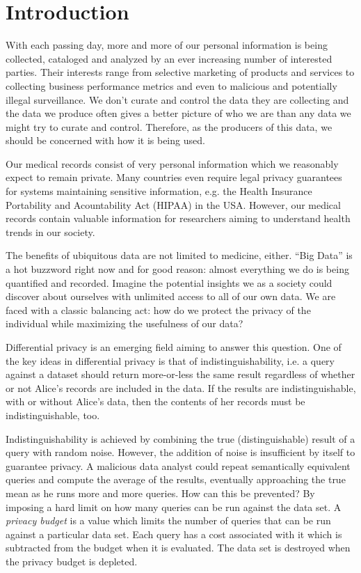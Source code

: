 \documentclass[12pt]{report}
\begin{document}
\clearpage
\tableofcontents
\clearpage
\listoffigures
\clearpage

\chapter{Introduction}\label{sec:introduction}

With each passing day, more and more of our personal information is being collected, cataloged and analyzed by an ever increasing number of interested parties.
Their interests range from selective marketing of products and services to collecting business performance metrics and even to malicious and potentially illegal surveillance.
We don't curate and control the data they are collecting and the data we produce often gives a better picture of who we are than any data we might try to curate and control.
Therefore, as the producers of this data, we should be concerned with how it is being used.

Our medical records consist of very personal information which we reasonably expect to remain private.
Many countries even require legal privacy guarantees for systems maintaining sensitive information, e.g. the Health Insurance Portability and Acountability Act (HIPAA) in the USA.
However, our medical records contain valuable information for researchers aiming to understand health trends in our society.

The benefits of ubiquitous data are not limited to medicine, either.
``Big Data'' is a hot buzzword right now and for good reason: almost everything we do is being quantified and recorded.
Imagine the potential insights we as a society could discover about ourselves with unlimited access to all of our own data.
We are faced with a classic balancing act: how do we protect the privacy of the individual while maximizing the usefulness of our data?

Differential privacy is an emerging field aiming to answer this question\cite{journals/cacm/Dwork11}.
One of the key ideas in differential privacy is that of indistinguishability, i.e. a query against a dataset should return more-or-less the same result regardless of whether or not Alice's records are included in the data.
If the results are indistinguishable, with or without Alice's data, then the contents of her records must be indistinguishable, too.

Indistinguishability is achieved by combining the true (distinguishable) result of a query with random noise.
However, the addition of noise is insufficient by itself to guarantee privacy.
A malicious data analyst could repeat semantically equivalent queries and compute the average of the results, eventually approaching the true mean as he runs more and more queries.
How can this be prevented?
By imposing a hard limit on how many queries can be run against the data set.
A \textit{privacy budget} is a value which limits the number of queries that can be run against a particular data set.
Each query has a cost associated with it which is subtracted from the budget when it is evaluated.
The data set is destroyed when the privacy budget is depleted.
\end{document}
